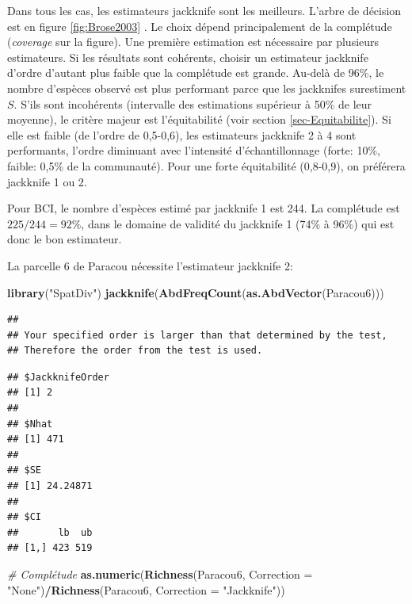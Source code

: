 \documentclass[
  11pt,
  french,
  a4paper,
  extrafontsizes,onecolumn,openright
  ]{memoir}
\newenvironment{Shaded}{\begin{snugshade}}{\end{snugshade}}
\newcommand{\AttributeTok}[1]{\textcolor[rgb]{0.13,0.29,0.53}{#1}}
\newcommand{\CommentTok}[1]{\textcolor[rgb]{0.56,0.35,0.01}{\textit{#1}}}
\newcommand{\FunctionTok}[1]{\textcolor[rgb]{0.13,0.29,0.53}{\textbf{#1}}}
\newcommand{\NormalTok}[1]{#1}
\newcommand{\SpecialCharTok}[1]{\textcolor[rgb]{0.81,0.36,0.00}{\textbf{#1}}}
\newcommand{\StringTok}[1]{\textcolor[rgb]{0.31,0.60,0.02}{#1}}
\newlength{\rf}
\begin{document}
\normalsize

Dans tous les cas, les estimateurs jackknife sont les meilleurs.
L'arbre de décision est en figure \ref{fig:Brose2003} \autocite[fig.~6]{Brose2003}.
Le choix dépend principalement de la complétude (\emph{coverage} sur la figure).
Une première estimation est nécessaire par plusieurs estimateurs.
Si les résultats sont cohérents, choisir un estimateur jackknife d'ordre d'autant plus faible que la complétude est grande.
Au-delà de 96\%, le nombre d'espèces observé est plus performant parce que les jackknifes surestiment \(S\).
S'ils sont incohérents (intervalle des estimations supérieur à 50\% de leur moyenne), le critère majeur est l'équitabilité (voir section \ref{sec-Equitabilite}).
Si elle est faible (de l'ordre de 0,5-0,6), les estimateurs jackknife 2 à 4 sont performants, l'ordre diminuant avec l'intensité d'échantillonnage (forte: 10\%, faible: 0,5\% de la communauté).
Pour une forte équitabilité (0,8-0,9), on préférera jackknife 1 ou 2.

Pour BCI, le nombre d'espèces estimé par jackknife 1 est 244.
La complétude est \({225}/{244}=92\%\), dans le domaine de validité du jackknife 1 (74\% à 96\%) qui est donc le bon estimateur.

La parcelle 6 de Paracou nécessite l'estimateur jackknife 2:

\scriptsize

\begin{Shaded}
\begin{Highlighting}[]
\FunctionTok{library}\NormalTok{(}\StringTok{"SpatDiv"}\NormalTok{)}
\FunctionTok{jackknife}\NormalTok{(}\FunctionTok{AbdFreqCount}\NormalTok{(}\FunctionTok{as.AbdVector}\NormalTok{(Paracou6)))}
\end{Highlighting}
\end{Shaded}

\begin{verbatim}
## 
## Your specified order is larger than that determined by the test, 
## Therefore the order from the test is used.
\end{verbatim}

\begin{verbatim}
## $JackknifeOrder
## [1] 2
## 
## $Nhat
## [1] 471
## 
## $SE
## [1] 24.24871
## 
## $CI
##       lb  ub
## [1,] 423 519
\end{verbatim}

\begin{Shaded}
\begin{Highlighting}[]
\CommentTok{\# Complétude}
\FunctionTok{as.numeric}\NormalTok{(}\FunctionTok{Richness}\NormalTok{(Paracou6, }\AttributeTok{Correction =} \StringTok{"None"}\NormalTok{)}\SpecialCharTok{/}\FunctionTok{Richness}\NormalTok{(Paracou6,}
    \AttributeTok{Correction =} \StringTok{"Jackknife"}\NormalTok{))}
\end{Highlighting}
\end{Shaded}
\end{document}
